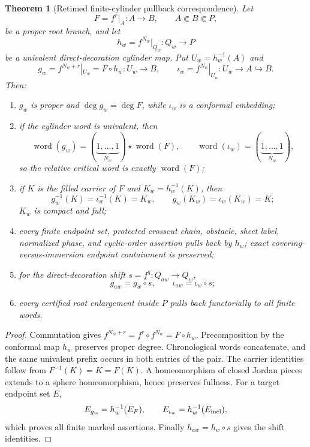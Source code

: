 \documentclass[11pt]{article}
\newtheorem{theorem}{Theorem}[section]
\theoremstyle{definition}
\theoremstyle{remark}
\newcommand{\word}{\operatorname{word}}
\begin{document}
\begin{theorem}[Retimed finite-cylinder pullback correspondence]\label{thm:retimed}
Let
\[
 F=f^r|_A:A\longrightarrow B,
 \qquad A\Subset B\Subset P,
\]
be a proper root branch, and let
\[
 h_w=f^{N_w}|_{Q_w}:Q_w\longrightarrow P
\]
be a univalent direct-decoration cylinder map.  Put $U_w=h_w^{-1}(A)$ and
\[
 g_w=f^{N_w+r}|_{U_w}=F\circ h_w:U_w\longrightarrow B,
 \qquad
 \iota_w=f^{N_w}|_{U_w}:U_w\longrightarrow A\hookrightarrow B.
\]
Then:
\begin{enumerate}[label=(\arabic*)]
\item $g_w$ is proper and $\deg g_w=\deg F$, while $\iota_w$ is a conformal embedding;
\item if the cylinder word is univalent, then
\[
 \word(g_w)=(\underbrace{1,\ldots,1}_{N_w})\star\word(F),
 \qquad
 \word(\iota_w)=(\underbrace{1,\ldots,1}_{N_w}),
\]
so the relative critical word is exactly $\word(F)$;
\item if $K$ is the filled carrier of $F$ and $K_w=h_w^{-1}(K)$, then
\[
 g_w^{-1}(K)=\iota_w^{-1}(K)=K_w,
 \qquad
 g_w(K_w)=\iota_w(K_w)=K;
\]
$K_w$ is compact and full;
\item every finite endpoint set, protected crosscut chain, obstacle, sheet label, normalized phase, and cyclic-order assertion pulls back by $h_w$; exact covering-versus-immersion endpoint containment is preserved;
\item for the direct-decoration shift $s=f^q:Q_{aw}\to Q_w$,
\[
 g_{aw}=g_w\circ s,
 \qquad
 \iota_{aw}=\iota_w\circ s;
\]
\item every certified root enlargement inside $P$ pulls back functorially to all finite words.
\end{enumerate}
\end{theorem}

\begin{proof}
Commutation gives $f^{N_w+r}=f^r\circ f^{N_w}=F\circ h_w$.  Precomposition by the conformal map $h_w$ preserves proper degree.  Chronological words concatenate, and the same univalent prefix occurs in both entries of the pair.  The carrier identities follow from $F^{-1}(K)=K=F(K)$.  A homeomorphism of closed Jordan pieces extends to a sphere homeomorphism, hence preserves fullness.  For a target endpoint set $E$,
\[
 E_{g_w}=h_w^{-1}(E_F),
 \qquad
 E_{\iota_w}=h_w^{-1}(E_{\rm incl}),
\]
which proves all finite marked assertions.  Finally $h_{aw}=h_w\circ s$ gives the shift identities.
\end{proof}
\end{document}

